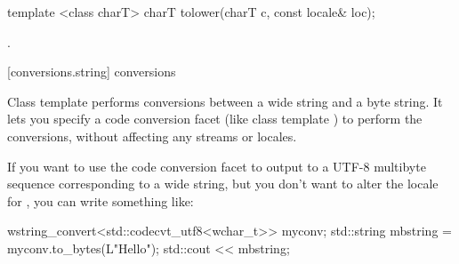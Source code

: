 %
\begin{itemdecl}
template <class charT> charT tolower(charT c, const locale& loc);
\end{itemdecl}

\begin{itemdescr}
\pnum
\returns
{}.
\end{itemdescr}

[conversions.string]{ conversions}

\pnum
Class template  performs conversions between a wide
string and a byte string. It lets you specify a code conversion facet
(like class template ) to perform the conversions, without
affecting any streams or locales. \begin{example} If you want to use the code
conversion facet  to output to  a UTF-8
multibyte sequence corresponding to a wide string, but you don't want to
alter the locale for , you can write something like:

\begin{codeblock}
wstring_convert<std::codecvt_utf8<wchar_t>> myconv;
std::string mbstring = myconv.to_bytes(L"Hello\n");
std::cout << mbstring;
\end{codeblock}
\end{example}

\pnum
{}

